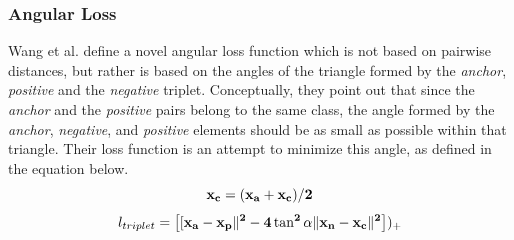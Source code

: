 \subsubsection{Angular Loss}
Wang et al. \cite{DBLP:journals/corr/abs-1708-01682} define a novel angular loss function which is not based on pairwise distances, but rather is based on the angles of the triangle formed by the \textit{anchor}, \textit{positive} and the \textit{negative} triplet.  Conceptually, they point out that since the \textit{anchor} and the \textit{positive} pairs belong to the same class, the angle formed by the \textit{anchor}, \textit{negative}, and \textit{positive} elements should be as small as possible within that triangle.  Their loss function is an attempt to minimize this angle, as defined in the equation below.
\begin{equation}
\bf{x_{c}} = (\bf{x_{a}} + \bf{x_{c}}) / 2
\end{equation}
\begin{equation}
l_{triplet} = \left[[\bf{x_{a}} - \bf{x_{p}}\|^2 - 4 \tan^2 \alpha \|\bf{x_{n}} - \bf{x_{c}}\|^2 \right])_{+}
\end{equation}
